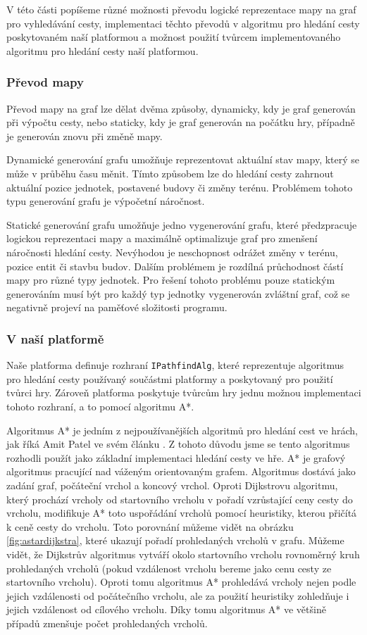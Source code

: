 V této části popíšeme různé možnosti převodu logické reprezentace mapy na graf pro vyhledávání cesty, implementaci těchto převodů v algoritmu pro hledání cesty poskytovaném naší platformou a možnost použití tvůrcem implementovaného algoritmu pro hledání cesty naší platformou.


\subsubsection{Převod mapy}
Převod mapy na graf lze dělat dvěma způsoby, dynamicky, kdy je graf generován při výpočtu cesty, nebo staticky, kdy je graf generován na počátku hry, případně je generován znovu při změně mapy.

Dynamické generování grafu umožňuje reprezentovat aktuální stav mapy, který se může v průběhu času měnit. Tímto způsobem lze do hledání cesty zahrnout aktuální pozice jednotek, postavené budovy či změny terénu. Problémem tohoto typu generování grafu je výpočetní náročnost.

Statické generování grafu umožňuje jedno vygenerování grafu, které předzpracuje logickou reprezentaci mapy a maximálně optimalizuje graf pro zmenšení náročnosti hledání cesty. Nevýhodou je neschopnost odrážet změny v terénu, pozice entit či stavbu budov. Dalším problémem je rozdílná průchodnost částí mapy pro různé typy jednotek. Pro řešení tohoto problému pouze statickým generováním musí být pro každý typ jednotky vygenerován zvláštní graf, což se negativně projeví na paměťové složitosti programu.

\subsubsection{V naší platformě}
Naše platforma definuje rozhraní \texttt{IPathfindAlg}, které reprezentuje algoritmus pro hledání cesty používaný součástmi platformy a poskytovaný pro použití tvůrci hry. Zároveň platforma poskytuje tvůrcům hry jednu možnou implementaci tohoto rozhraní, a to pomocí algoritmu A*.

Algoritmus A* je jedním z nejpoužívanějších algoritmů pro hledání cest ve hrách, jak říká Amit Patel ve svém článku \citep{site:introastar}. Z tohoto důvodu jsme se tento algoritmus rozhodli použít jako základní implementaci hledání cesty ve hře. A* je grafový algoritmus pracující nad váženým orientovaným grafem. Algoritmus dostává jako zadání graf, počáteční vrchol a koncový vrchol. Oproti Dijkstrovu algoritmu, který prochází vrcholy od startovního vrcholu v pořadí vzrůstající ceny cesty do vrcholu, modifikuje A* toto uspořádání vrcholů pomocí heuristiky, kterou přičítá k ceně cesty do vrcholu. Toto porovnání můžeme vidět na obrázku \ref{fig:astardijkstra}, které ukazují pořadí prohledaných vrcholů v grafu. Můžeme vidět, že Dijkstrův algoritmus vytváří okolo startovního vrcholu rovnoměrný kruh prohledaných vrcholů (pokud vzdálenost vrcholu bereme jako cenu cesty ze startovního vrcholu). Oproti tomu algoritmus A* prohledává vrcholy nejen podle jejich vzdálenosti od počátečního vrcholu, ale za použití heuristiky zohledňuje i jejich vzdálenost od cílového vrcholu. Díky tomu algoritmus A* ve většině případů zmenšuje počet prohledaných vrcholů.

